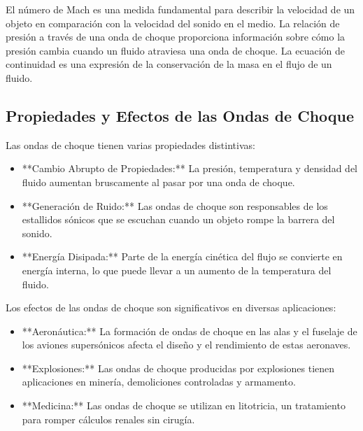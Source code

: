 \documentclass[../main]{subfiles}
\begin{document}

El número de Mach es una medida fundamental para describir la velocidad de un objeto en comparación con la velocidad del sonido en el medio. La relación de presión a través de una onda de choque proporciona información sobre cómo la presión cambia cuando un fluido atraviesa una onda de choque. La ecuación de continuidad es una expresión de la conservación de la masa en el flujo de un fluido.

\subsection{Propiedades y Efectos de las Ondas de Choque}

Las ondas de choque tienen varias propiedades distintivas:
\begin{itemize}
    \item **Cambio Abrupto de Propiedades:** La presión, temperatura y densidad del fluido aumentan bruscamente al pasar por una onda de choque.
    \item **Generación de Ruido:** Las ondas de choque son responsables de los estallidos sónicos que se escuchan cuando un objeto rompe la barrera del sonido.
    \item **Energía Disipada:** Parte de la energía cinética del flujo se convierte en energía interna, lo que puede llevar a un aumento de la temperatura del fluido.
    \end{itemize}
Los efectos de las ondas de choque son significativos en diversas aplicaciones:
\begin{itemize}
    \item **Aeronáutica:** La formación de ondas de choque en las alas y el fuselaje de los aviones supersónicos afecta el diseño y el rendimiento de estas aeronaves.
    \item **Explosiones:** Las ondas de choque producidas por explosiones tienen aplicaciones en minería, demoliciones controladas y armamento.
    \item **Medicina:** Las ondas de choque se utilizan en litotricia, un tratamiento para romper cálculos renales sin cirugía.
\end{itemize}
\end{document}

